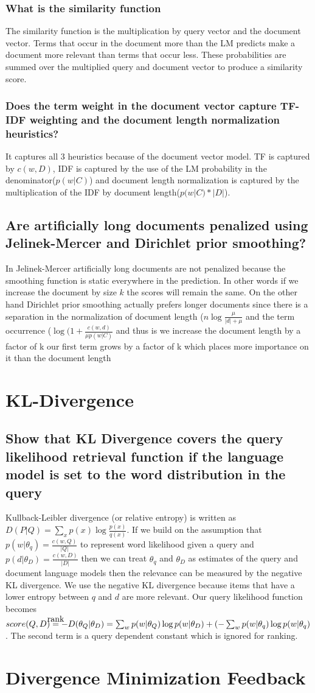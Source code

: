 \documentclass[11pt]{article}
\newcommand\myeq{\stackrel{\mathclap{\normalfont\mbox{rank}}}{=}}
\begin{document}
\subsubsection{What is the similarity function}
The similarity function is the multiplication by query vector and the document vector. Terms that occur in the document more than the LM predicts make a document more relevant than terms that occur less. These probabilities are summed over the multiplied query and document vector to produce a similarity score. 
\subsubsection{Does the term weight in the document vector capture TF-IDF weighting and the document length normalization heuristics?}
It captures all 3 heuristics because of the document vector model. TF is captured by $c(w,D)$, IDF is captured by the use of the LM probability in the denominator($p(w|C)$) and document length normalization is captured by the multiplication of the IDF by document length($p(w|C) * |D|$).
\subsection{Are artificially long documents penalized using Jelinek-Mercer and Dirichlet prior smoothing?}
In Jelinek-Mercer artificially long documents are not penalized because the smoothing function is static everywhere in the prediction. In other words if we increase the document by size $k$ the scores will remain the same. On the other hand Dirichlet prior smoothing actually prefers longer documents since there is a separation in the normalization of document length ($n \log \frac{\mu}{|d| + \mu}$ and the term occurrence ($\log (1+\frac{c(w,d)}{\mu p(w|C)}$ and thus is we increase the document length by a factor of k our first term grows by a factor of k which places more importance on it than the document length
\section{KL-Divergence}
\subsection{Show that KL Divergence covers the query likelihood retrieval function if the language model is set to the word distribution in the query}
Kullback-Leibler divergence (or relative entropy) is written as $D(P | Q) = \sum_x p(x) \log \frac{p(x)}{q(x)}$. If we build on the assumption that $p(w|\theta_q)= \frac{c(w,Q)}{|Q|}$ to represent word likelihood given a query and $p(d|\theta_D) = \frac{c(w,D)}{|D|}$ then we can treat $\theta_q$ and $\theta_D$ as estimates of the query and document language models then the relevance can be measured by the negative KL divergence. We use the negative KL divergence because items that have a lower entropy between $q$ and $d$ are more relevant. Our query likelihood function becomes $score(Q,D) \myeq - D(\theta_Q| \theta_D) = \sum_w p(w|\theta_Q)\log p(w|\theta_D) + (- \sum_w p(w|\theta_q) \log p(w| \theta_q)$. The second term is a query dependent constant which is ignored for ranking.
\section{Divergence Minimization Feedback}
\end{document}
